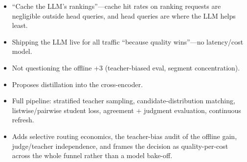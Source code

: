 \begin{interviewq}
\redflags
\begin{itemize}
    \item ``Cache the LLM's rankings''---cache hit rates on ranking requests are negligible outside head queries, and head queries are where the LLM helps least.
    \item Shipping the LLM live for all traffic ``because quality wins''---no latency/cost model.
    \item Not questioning the offline +3 (teacher-biased eval, segment concentration).
\end{itemize}


\goodgreat
\begin{itemize}
    \item {} Proposes distillation into the cross-encoder.
    \item {} Full pipeline: stratified teacher sampling, candidate-distribution matching, listwise/pairwise student loss, agreement + judgment evaluation, continuous refresh.
    \item {} Adds selective routing economics, the teacher-bias audit of the offline gain, judge/teacher independence, and frames the decision as quality-per-cost across the whole funnel rather than a model bake-off.
\end{itemize}

\end{interviewq}


